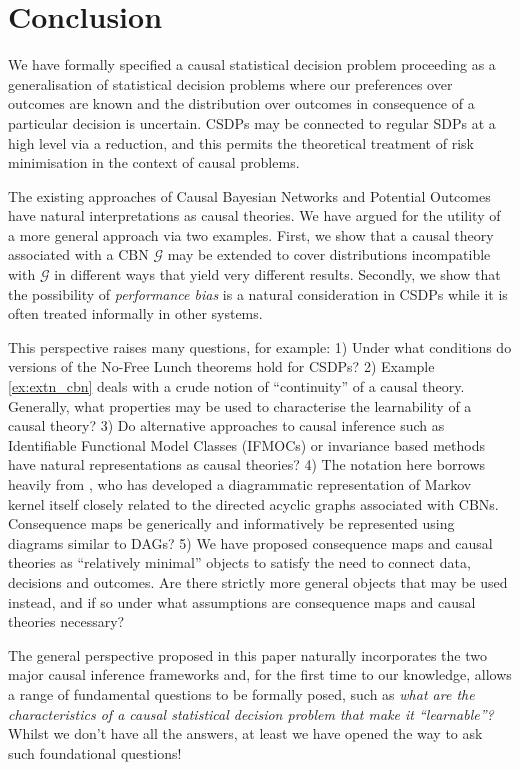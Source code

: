 \documentclass{article}
\theoremstyle{plain}
\theoremstyle{definition}
\begin{document}






\section{Conclusion}

We have formally specified a causal statistical decision problem proceeding as a generalisation of statistical decision problems where our preferences over outcomes are known and the distribution over outcomes in consequence of a particular decision is uncertain. CSDPs may be connected to regular SDPs at a high level via a reduction, and this permits the theoretical treatment of risk minimisation in the context of causal problems.

The existing approaches of Causal Bayesian Networks and Potential Outcomes have natural interpretations as causal theories. We have argued for the utility of a more general approach via two examples. First, we show that a causal theory associated with a CBN $\mathcal{G}$ may be extended to cover distributions incompatible with $\mathcal{G}$ in different ways that yield very different results. Secondly, we show that the possibility of \emph{performance bias} is a natural consideration in CSDPs while it is often treated informally in other systems.

This perspective raises many questions, for example: 1) Under what conditions do versions of the No-Free Lunch theorems hold for CSDPs? 2) Example \ref{ex:extn_cbn} deals with a crude notion of ``continuity'' of a causal theory. Generally, what properties may be used to characterise the learnability of a causal theory? 3) Do alternative approaches to causal inference such as Identifiable Functional Model Classes (IFMOCs) or invariance based methods have natural representations as causal theories? 4) The notation here borrows heavily from \citep{fong_causal_2013}, who has developed a diagrammatic representation of Markov kernel itself closely related to the directed acyclic graphs associated with CBNs. Consequence maps be generically and informatively be represented using diagrams similar to DAGs? 5) We have proposed consequence maps and causal theories as ``relatively minimal'' objects to satisfy the need to connect data, decisions and outcomes. Are there strictly more general objects that may be used instead, and if so under what assumptions are consequence maps and causal theories necessary?

The general perspective proposed in this paper naturally incorporates the two major causal inference frameworks and, for the first time to our knowledge, allows a range of fundamental questions to be formally posed, such as \emph{what are the characteristics of a causal statistical decision problem that make it ``learnable”?} Whilst we don’t have all the answers, at least we have opened the way to ask such foundational questions!









\end{document}
